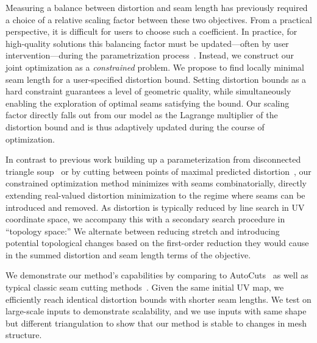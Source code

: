 Measuring a balance between distortion and seam length has previously required a choice of a relative scaling factor between these two objectives.  From a practical perspective, it is difficult for users to choose such a coefficient. %
In practice, for high-quality solutions this balancing factor must be %
updated---often by user intervention---during the parametrization process\ \cite{Poranne2017Autocuts}. Instead, we construct our joint optimization as a \emph{constrained} problem. We propose to find locally minimal seam length for a user-specified distortion bound. Setting distortion bounds as a hard constraint guarantees a level of geometric quality, while simultaneously enabling the exploration of optimal seams satisfying the bound. %
Our scaling factor directly falls out from our model as the Lagrange multiplier of the distortion bound and is thus adaptively updated during the course of optimization.  %

In contrast to previous work building up a parameterization from disconnected triangle soup~\cite{Poranne2017Autocuts} or by cutting between points of maximal predicted distortion~\cite{Gu2002Geometry,Sheffer2002Seamster}, our constrained optimization method minimizes with seams combinatorially, directly extending real-valued distortion minimization to the regime where seams can be introduced and removed. As distortion is typically reduced by line search in UV coordinate space, we accompany this with a secondary search procedure in ``topology space:'' We alternate between reducing stretch and introducing potential topological changes based on the first-order reduction they would cause in the summed distortion and seam length terms of the objective. %


We demonstrate our method's capabilities by comparing to AutoCuts~\cite{Poranne2017Autocuts} as well as typical classic seam cutting methods~\cite{Gu2002Geometry,Sheffer2002Seamster}. %
Given the same initial UV map, we efficiently reach identical distortion bounds with shorter seam lengths. We test on large-scale inputs to demonstrate scalability, and we use inputs with same shape but different triangulation to show that our method is stable to changes in mesh structure.

